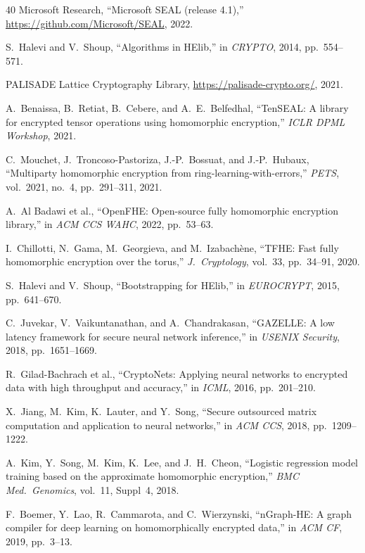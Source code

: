 \begin{thebibliography}{40}
Microsoft Research, ``Microsoft SEAL (release 4.1),'' \url{https://github.com/Microsoft/SEAL}, 2022.

S.~Halevi and V.~Shoup, ``Algorithms in HElib,'' in \emph{CRYPTO}, 2014, pp.~554--571.

PALISADE Lattice Cryptography Library, \url{https://palisade-crypto.org/}, 2021.

A.~Benaissa, B.~Retiat, B.~Cebere, and A.~E.~Belfedhal, ``TenSEAL: A library for encrypted tensor operations using homomorphic encryption,'' \emph{ICLR DPML Workshop}, 2021.

C.~Mouchet, J.~Troncoso-Pastoriza, J.-P.~Bossuat, and J.-P.~Hubaux, ``Multiparty homomorphic encryption from ring-learning-with-errors,'' \emph{PETS}, vol.~2021, no.~4, pp.~291--311, 2021.

A.~Al Badawi et al., ``OpenFHE: Open-source fully homomorphic encryption library,'' in \emph{ACM CCS WAHC}, 2022, pp.~53--63.

I.~Chillotti, N.~Gama, M.~Georgieva, and M.~Izabach\`{e}ne, ``TFHE: Fast fully homomorphic encryption over the torus,'' \emph{J.\ Cryptology}, vol.~33, pp.~34--91, 2020.

S.~Halevi and V.~Shoup, ``Bootstrapping for HElib,'' in \emph{EUROCRYPT}, 2015, pp.~641--670.

C.~Juvekar, V.~Vaikuntanathan, and A.~Chandrakasan, ``GAZELLE: A low latency framework for secure neural network inference,'' in \emph{USENIX Security}, 2018, pp.~1651--1669.

R.~Gilad-Bachrach et al., ``CryptoNets: Applying neural networks to encrypted data with high throughput and accuracy,'' in \emph{ICML}, 2016, pp.~201--210.

X.~Jiang, M.~Kim, K.~Lauter, and Y.~Song, ``Secure outsourced matrix computation and application to neural networks,'' in \emph{ACM CCS}, 2018, pp.~1209--1222.

A.~Kim, Y.~Song, M.~Kim, K.~Lee, and J.~H.~Cheon, ``Logistic regression model training based on the approximate homomorphic encryption,'' \emph{BMC Med.\ Genomics}, vol.~11, Suppl~4, 2018.

F.~Boemer, Y.~Lao, R.~Cammarota, and C.~Wierzynski, ``nGraph-HE: A graph compiler for deep learning on homomorphically encrypted data,'' in \emph{ACM CF}, 2019, pp.~3--13.


\end{thebibliography}
